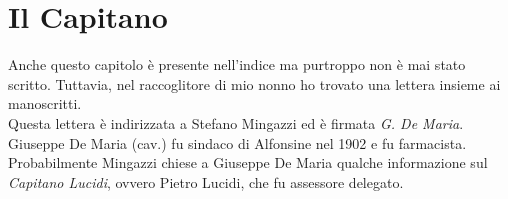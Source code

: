 
\chapter{Il Capitano}
Anche questo capitolo è presente nell'indice ma purtroppo non è mai stato scritto. Tuttavia, nel raccoglitore di mio nonno ho trovato una lettera insieme ai manoscritti.\\
\indent Questa lettera è indirizzata a Stefano Mingazzi ed è firmata \emph{G. De Maria}. Giuseppe De Maria (cav.) fu sindaco di Alfonsine nel 1902 e fu farmacista.\\
\indent Probabilmente Mingazzi chiese a Giuseppe De Maria qualche informazione sul \emph{Capitano Lucidi}, ovvero Pietro Lucidi, che fu assessore delegato.\\

